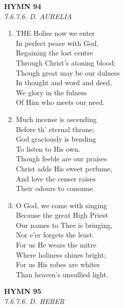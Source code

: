 \newpage
\begin{center}
    {\Large \textbf{HYMN 94\textdagger{}}}
    \\
    \textit{7.6.7.6. D. AURELIA}
\end{center}
\vspace{1em}

\begin{enumerate}
    \item THE Holies now we enter \\
        In perfect peace with God, \\
        Regaining the lost centre \\
        Through Christ's atoning blood; \\
        Though great may be our dulness \\
        In thought and word and deed, \\
        We glory in the fulness \\
        Of Him who meets our need.

    \item Much incense is ascending \\
        Before th' eternal throne; \\
        God graciously is bending \\
        To listen to His own. \\
        Though feeble are our praises \\
        Christ adds His sweet perfume, \\
        And love the censer raises \\
        Their odours to consume.

    \item O God, we come with singing \\
        Because the great High Priest \\
        Our names to Thee is bringing, \\
        Nor e'er forgets the least. \\
        For us He wears the mitre \\
        Where holiness shines bright; \\
        For us His robes are whiter \\
        Than heaven's unsullied light.

\end{enumerate}

\newpage
\begin{center}
    {\Large \textbf{HYMN 95\textdagger{}}}
    \\
    \textit{7.6.7.6. D. HEBER}
\end{center}
\vspace{1em}

